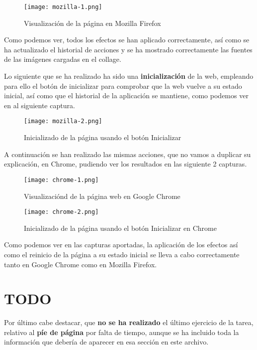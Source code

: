 \begin{figure}[H]
    \centering
    \texttt{[image: mozilla-1.png]}
    \caption{Visualización de la página en Mozilla Firefox}
\end{figure}

Como podemos ver, todos los efectos se han aplicado correctamente, así como se ha actualizado el historial de acciones y se ha mostrado correctamente las fuentes de las imágenes cargadas en el collage.

Lo siguiente que se ha realizado ha sido una \textbf{inicialización} de la web, empleando para ello el botón de inicializar para comprobar que la web vuelve a su estado inicial, así como que el historial de la aplicación se mantiene, como podemos ver en al siguiente captura.

\begin{figure}[H]
    \centering
    \texttt{[image: mozilla-2.png]}
    \caption{Inicializado de la página usando el botón Inicializar}
\end{figure}

A continuación se han realizado las mismas acciones, que no vamos a duplicar su explicación, en Chrome, pudiendo ver los resultados en las siguiente 2 capturas.

\begin{figure}[H]
    \centering
    \texttt{[image: chrome-1.png]}
    \caption{Visualizaciónd de la página web en Google Chrome}
\end{figure}

\begin{figure}[H]
    \centering
    \texttt{[image: chrome-2.png]}
    \caption{Inicializado de la página usando el botón Inicializar en Chrome}
\end{figure}

Como podemos ver en las capturas aportadas, la aplicación de los efectos así como el reinicio de la página a su estado inicial se lleva a cabo correctamente tanto en Google Chrome como en Mozilla Firefox.

\section{TODO}
Por último cabe destacar, que \textbf{no se ha realizado} el último ejercicio de la tarea, relativo al \textbf{píe de página} por falta de tiempo, aunque se ha incluido toda la información que debería de aparecer en esa sección en este archivo.



%
%


